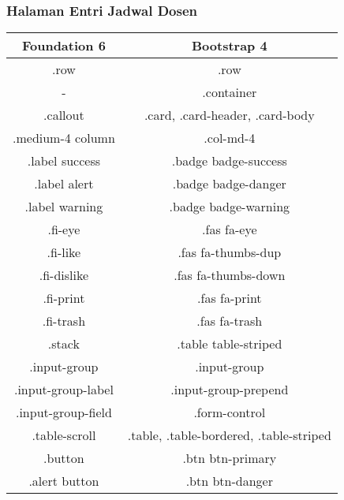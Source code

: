 \subsubsection{Halaman Entri Jadwal Dosen}
\begin{tabular}{||c|c||} 
	\hline
	\textbf{Foundation 6} & \textbf{Bootstrap 4}  \\ [0.5ex] 
	\hline\hline
	.row &   .row\\ 
	\hline	
	- &  .container \\
	\hline	
	.callout &  .card, .card-header, .card-body \\
	\hline
	.medium-4 column &  .col-md-4 \\
	\hline		
	.label success &  .badge badge-success \\
	\hline	
	.label alert & .badge badge-danger  \\
	\hline	
	.label warning & .badge badge-warning  \\
	\hline	
	.fi-eye &  .fas fa-eye \\
	\hline	
	.fi-like &  .fas fa-thumbs-dup \\	
	\hline	
	.fi-dislike &  .fas fa-thumbs-down \\
	\hline	
	.fi-print &  .fas fa-print \\
	\hline	
	.fi-trash &  .fas fa-trash \\
	\hline	
	.stack & .table table-striped  \\
	\hline	
	.input-group & .input-group  \\ 
	\hline	
	.input-group-label & .input-group-prepend  \\ 
	\hline	
	.input-group-field & .form-control \\ 	
	
	\hline	
	.table-scroll & .table, .table-bordered, .table-striped \\
	\hline	
	.button & .btn btn-primary  \\
	\hline	
	.alert button & .btn btn-danger  \\ [1ex] 
	\hline
\end{tabular}
